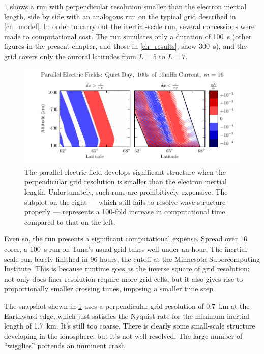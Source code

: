 \cref{fig_inertial_length} shows a run with perpendicular resolution smaller
than the electron inertial length, side by side with an analogous run on the
typical grid described in \cref{ch_model}. In order to carry out the
inertial-scale run, several concessions were made to computational cost. The
run simulates only a duration of \SI{100}{\s} (other figures in the present
chapter, and those in \cref{ch_results}, show \SI{300}{\s}), and the grid
covers only the auroral latitudes from $L=5$ to $L=7$. 

\begin{figure}[!htb]
  \centering
  \includegraphics[width=\textwidth]{figures/inertial_length.pdf}
  \caption[Parallel Electric Fields by Perpendicular Grid Resolution]{
    The parallel electric field develops significant structure when the
    perpendicular grid resolution is smaller than the electron inertial
    length. Unfortunately, such runs are prohibitively expensive. The subplot
    on the right --- which still fails to resolve wave structure properly ---
    represents a 100-fold increase in computational time compared to that on
    the left. 
  }
  \label{fig_inertial_length}
\end{figure}

Even so, the run presents a significant computational expense. Spread over 16
cores, a \SI{100}{\s} run on Tuna's usual grid takes well under an hour. The
inertial-scale run barely finished in 96 hours, the cutoff at the Minnesota
Supercomputing Institute. This is because runtime goes as the inverse square of
grid resolution; not only does finer resolution require more grid cells, but it
also gives rise to proportionally smaller crossing times, imposing a smaller
time step. 

The snapshot shown in \cref{fig_inertial_length} uses a perpendicular grid
resolution of \SI{0.7}{\km} at the Earthward edge, which just satisfies the
Nyquist rate for the minimum inertial length of \SI{1.7}{\km}. It's still too
coarse. There is clearly some small-scale structure developing in the
ionosphere, but it's not well resolved. The large number of ``wigglies''
portends an imminent crash. 

